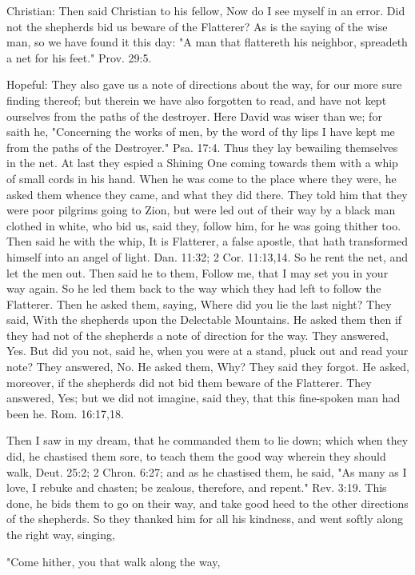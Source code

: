 Christian: Then said Christian to his fellow, Now do I see myself in an
error. Did not the shepherds bid us beware of the Flatterer? As is the
saying of the wise man, so we have found it this day: "A man that
flattereth his neighbor, spreadeth a net for his feet." Prov. 29:5.

Hopeful: They also gave us a note of directions about the way, for our
more sure finding thereof; but therein we have also forgotten to read,
and have not kept ourselves from the paths of the destroyer. Here David
was wiser than we; for saith he, "Concerning the works of men, by the
word of thy lips I have kept me from the paths of the Destroyer." Psa.
17:4. Thus they lay bewailing themselves in the net. At last they
espied a Shining One coming towards them with a whip of small cords in
his hand. When he was come to the place where they were, he asked them
whence they came, and what they did there. They told him that they were
poor pilgrims going to Zion, but were led out of their way by a black
man clothed in white, who bid us, said they, follow him, for he was
going thither too. Then said he with the whip, It is Flatterer, a false
apostle, that hath transformed himself into an angel of light. Dan.
11:32; 2 Cor. 11:13,14. So he rent the net, and let the men out. Then
said he to them, Follow me, that I may set you in your way again. So he
led them back to the way which they had left to follow the Flatterer.
Then he asked them, saying, Where did you lie the last night? They
said, With the shepherds upon the Delectable Mountains. He asked them
then if they had not of the shepherds a note of direction for the way.
They answered, Yes. But did you not, said he, when you were at a stand,
pluck out and read your note? They answered, No. He asked them, Why?
They said they forgot. He asked, moreover, if the shepherds did not bid
them beware of the Flatterer. They answered, Yes; but we did not
imagine, said they, that this fine-spoken man had been he. Rom.
16:17,18.

Then I saw in my dream, that he commanded them to lie down; which when
they did, he chastised them sore, to teach them the good way wherein
they should walk, Deut. 25:2; 2 Chron. 6:27; and as he chastised them,
he said, "As many as I love, I rebuke and chasten; be zealous,
therefore, and repent." Rev. 3:19. This done, he bids them to go on
their way, and take good heed to the other directions of the shepherds.
So they thanked him for all his kindness, and went softly along the
right way, singing,


"Come hither, you that walk along the way,

